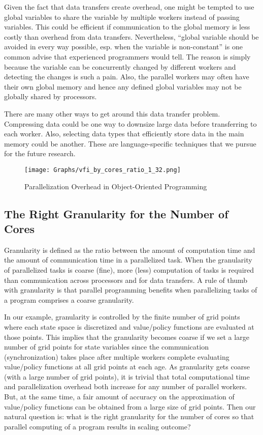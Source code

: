 \documentclass[12pt]{article}
\begin{document}
Given the fact that data transfers create overhead, one might be tempted to use global variables to share the variable by multiple workers instead of passing variables. This could be efficient if communication to the global memory is less costly than overhead from data transfers. Nevertheless, ``global variable should be avoided in every way possible, esp. when the variable is non-constant'' is one common advise that experienced programmers would tell. The reason is simply because the variable can be concurrently changed by different workers and detecting the changes is such a pain. Also, the parallel workers may often have their own global memory and hence any defined global variables may not be globally shared by processors.

There are many other ways to get around this data transfer problem. Compressing data could be one way to downsize large data before transferring to each worker. Also, selecting data types that efficiently store data in the main memory could be another. These are language-specific techniques that we pursue for the future research.


\begin{figure}[h!]
\sf
\begin{center}
\caption{\sf Parallelization Overhead in Object-Oriented Programming}
\texttt{[image: Graphs/vfi\_by\_cores\_ratio\_1\_32.png]}\label{fig:po_oop}
\end{center}
\end{figure}


\subsection{The Right Granularity for the Number of Cores}


Granularity is defined as the ratio between the amount of computation time and the amount of communication time in a parallelized task. When the granularity of parallelized tasks is coarse (fine), more (less) computation of tasks is required than communication across processors and for data transfers. A rule of thumb with granularity is that parallel programming benefits when parallelizing tasks of a program comprises a coarse granularity. 

In our example, granularity is controlled by the finite number of grid points where each state space is discretized and value/policy functions are evaluated at those points. This implies that the granularity becomes coarse if we set a large number of grid points for state variables since the communication (synchronization) takes place after multiple workers complete evaluating value/policy functions at all grid points at each age. As granularity gets coarse (with a large number of grid points), it is trivial that total computational time and parallelization overhead both increase for any number of parallel workers. But, at the same time, a fair amount of accuracy on the approximation of value/policy functions can be obtained from a large size of grid points. Then our natural question is: what is the right granularity for the number of cores so that parallel computing of a program results in scaling outcome?
\end{document}
